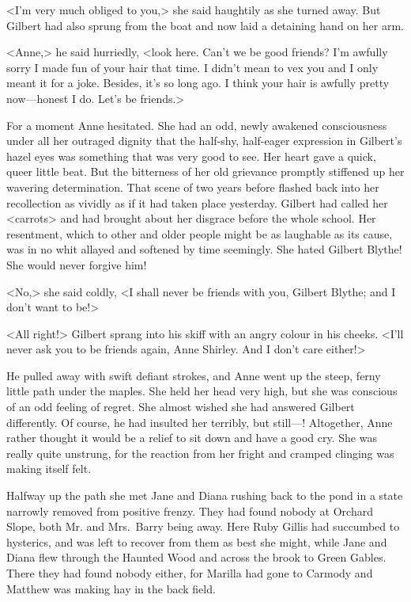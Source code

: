 <I'm very much obliged to you,> she said haughtily as she turned away. But Gilbert had also sprung from the boat and now laid a detaining hand on her arm.

<Anne,> he said hurriedly, <look here. Can't we be good friends? I'm awfully sorry I made fun of your hair that time. I didn't mean to vex you and I only meant it for a joke. Besides, it's so long ago. I think your hair is awfully pretty now—honest I do. Let's be friends.>

For a moment Anne hesitated. She had an odd, newly awakened consciousness under all her outraged dignity that the half-shy, half-eager expression in Gilbert's hazel eyes was something that was very good to see. Her heart gave a quick, queer little beat. But the bitterness of her old grievance promptly stiffened up her wavering determination. That scene of two years before flashed back into her recollection as vividly as if it had taken place yesterday. Gilbert had called her <carrots> and had brought about her disgrace before the whole school. Her resentment, which to other and older people might be as laughable as its cause, was in no whit allayed and softened by time seemingly. She hated Gilbert Blythe! She would never forgive him!

<No,> she said coldly, <I shall never be friends with you, Gilbert Blythe; and I don't want to be!>

<All right!> Gilbert sprang into his skiff with an angry colour in his cheeks. <I'll never ask you to be friends again, Anne Shirley. And I don't care either!>

He pulled away with swift defiant strokes, and Anne went up the steep, ferny little path under the maples. She held her head very high, but she was conscious of an odd feeling of regret. She almost wished she had answered Gilbert differently. Of course, he had insulted her terribly, but still—! Altogether, Anne rather thought it would be a relief to sit down and have a good cry. She was really quite unstrung, for the reaction from her fright and cramped clinging was making itself felt.

Halfway up the path she met Jane and Diana rushing back to the pond in a state narrowly removed from positive frenzy. They had found nobody at Orchard Slope, both Mr. and Mrs.~Barry being away. Here Ruby Gillis had succumbed to hysterics, and was left to recover from them as best she might, while Jane and Diana flew through the Haunted Wood and across the brook to Green Gables. There they had found nobody either, for Marilla had gone to Carmody and Matthew was making hay in the back field.

